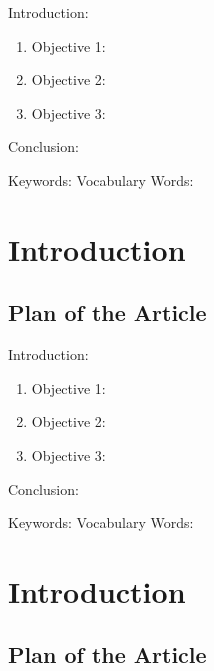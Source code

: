 

\twocolumn
\scriptsize
\begin{frontmatter}
		\title{}
		\author{}
		\address{The Mathematical Learning Space}
\end{frontmatter}	

Introduction:
\begin{enumerate}
\item Objective 1:
\item Objective 2:
\item Objective 3:
\end{enumerate}
Conclusion:

Keywords: 
Vocabulary Words:

\section{Introduction}

\subsection{Plan of the Article}


\twocolumn
\scriptsize
\begin{frontmatter}
		\title{}
		\author{}
		\address{The Mathematical Learning Space}
\end{frontmatter}	

Introduction:
\begin{enumerate}
\item Objective 1:
\item Objective 2:
\item Objective 3:
\end{enumerate}
Conclusion:

Keywords:
Vocabulary Words:

\section{Introduction}

\subsection{Plan of the Article}

